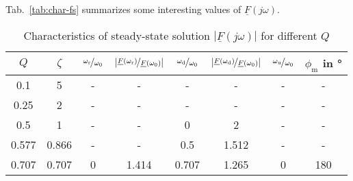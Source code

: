 \documentclass{article}[11pt]
\begin{document}
Tab.~\ref{tab:char-fs} summarizes some interesting values of
$\underline{F}(j\omega)$.
\begin{table}[H]
\centering
\caption{Characteristics of steady-state solution 
  $\left|\underline{F}(j\omega)\right|$ for different $Q$}
\begin{tabular}{cccccccc}
\toprule
$Q$      & $\zeta$ & $\nicefrac{\omega_{\mathrm{r}}}{\omega_0}$ & $\left|\nicefrac{\underline{F}(\omega_{\mathrm{r}})}{\underline{F}(\omega_{\mathrm{0}})}\right|$ & $\nicefrac{\omega_{\mathrm{d}}}{\omega_0}$ & $\left|\nicefrac{\underline{F}(\omega_{\mathrm{d}})}{\underline{F}(\omega_{\mathrm{0}})}\right|$ & $\nicefrac{\omega_{\mathrm{u}}}{\omega_0}$ & $\phi_{\mathrm{m}}$ in \si{\degree} \\ \midrule
0.1      & 5       & -                                          & -                                                                                                & -                                          & -                                                                                                & -                                          & -                                   \\
0.25     & 2       & -                                          & -                                                                                                & -                                          & -                                                                                                & -                                          & -                                   \\
0.5      & 1       & -                                          & -                                                                                                & 0                                          & 2                                                                                                & -                                          & -                                   \\
0.577    & 0.866   & -                                          & -                                                                                                & 0.5                                        & 1.512                                                                                            & -                                          & -                                   \\
0.707    & 0.707   & 0                                          & 1.414                                                                                            & 0.707                                      & 1.265                                                                                            & 0                                          & 180                                 \\

\end{tabular}
\end{table}
\end{document}
